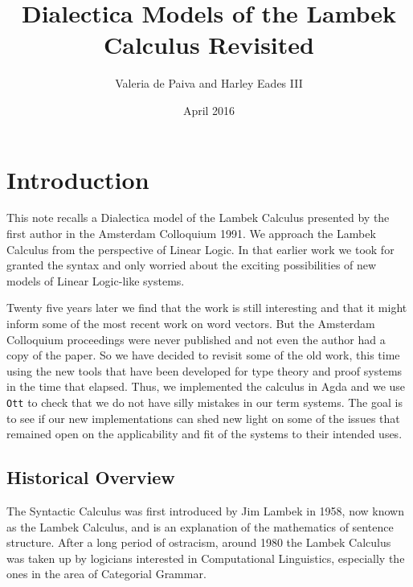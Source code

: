\documentclass{article}
\title{Dialectica Models of the Lambek Calculus Revisited}
\author{Valeria de Paiva and Harley Eades III}
\date{April 2016}
\begin{document}
\maketitle

\section*{Introduction}

This note recalls a Dialectica model of the Lambek Calculus presented
by the first author in the Amsterdam Colloquium 1991. We approach the
Lambek Calculus from the perspective of Linear Logic. In that earlier
work we took for granted the syntax and only worried about the
exciting possibilities of new models of Linear Logic-like systems.

Twenty five years later we find that the work is still interesting and
that it might inform some of the most recent work on word vectors. But
the Amsterdam Colloquium proceedings were never published and not even
the author had a copy of the paper. So we have decided to revisit some
of the old work, this time using the new tools that have been
developed for type theory and proof systems in the time that
elapsed. Thus, we implemented the calculus in Agda and we use
\texttt{Ott} \cite{Sewell:2010} to check that we do not have silly
mistakes in our term systems. The goal is to see if our new
implementations can shed new light on some of the issues that remained
open on the applicability and fit of the systems to their intended
uses.

\subsection*{Historical Overview}
The Syntactic Calculus was first introduced by Jim Lambek in 1958, now
known as the Lambek Calculus, and is an explanation of the mathematics
of sentence structure.  After a long period of ostracism, around 1980
the Lambek Calculus was taken up by logicians interested in
Computational Linguistics, especially the ones in the area of
Categorial Grammar.
\end{document}
